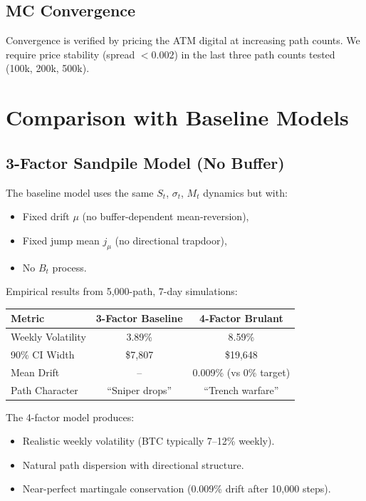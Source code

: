 \documentclass[11pt,a4paper]{article}
\begin{document}
\subsection{MC Convergence}

Convergence is verified by pricing the ATM digital at increasing path
counts. We require price stability (spread $< 0.002$) in the last three
path counts tested (100k, 200k, 500k).

\section{Comparison with Baseline Models}
\label{sec:comparison}

\subsection{3-Factor Sandpile Model (No Buffer)}

The baseline model uses the same $S_t$, $\sigma_t$, $M_t$ dynamics but
with:
\begin{itemize}[nosep]
  \item Fixed drift $\mu$ (no buffer-dependent mean-reversion),
  \item Fixed jump mean $j_\mu$ (no directional trapdoor),
  \item No $B_t$ process.
\end{itemize}

Empirical results from 5,000-path, 7-day simulations:

\begin{center}
\begin{tabular}{lcc}
\toprule
\textbf{Metric} & \textbf{3-Factor Baseline} & \textbf{4-Factor Brulant} \\
\midrule
Weekly Volatility & 3.89\% & 8.59\% \\
90\% CI Width & \$7,807 & \$19,648 \\
Mean Drift & -- & 0.009\% (vs 0\% target) \\
Path Character & ``Sniper drops'' & ``Trench warfare'' \\
\bottomrule
\end{tabular}
\end{center}

The 4-factor model produces:
\begin{itemize}[nosep]
  \item Realistic weekly volatility (BTC typically 7--12\% weekly).
  \item Natural path dispersion with directional structure.
  \item Near-perfect martingale conservation (0.009\% drift after 10,000 steps).
\end{itemize}
\end{document}
